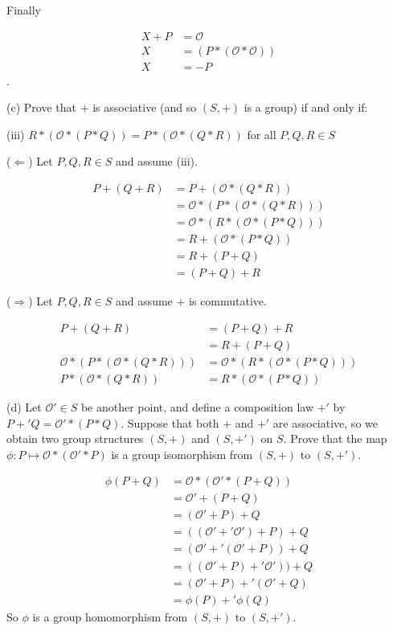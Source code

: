 \documentclass{article}
\begin{document}
Finally

\begin{align*}
X+P &= \mathcal{O}\\
X &= (P * (\mathcal{O} * \mathcal{O}))\\
X &= -P
\end{align*}.

(c) Prove that $+$ is associative (and so $(S,+)$ is a group) if and only if:

(iii) $R*(\mathcal{O}*(P*Q)) = P*(\mathcal{O}*(Q*R))$ for all $P,Q,R \in S$

($\Leftarrow$) Let $P,Q,R \in S$ and assume (iii).

\begin{align*}
P + (Q + R) &= P + (\mathcal{O} * (Q * R)) \\
&= \mathcal{O} * (P * (\mathcal{O} * (Q * R))) \\
&= \mathcal{O} * (R * (\mathcal{O} * (P * Q))) \\
&= R + (\mathcal{O} * (P * Q)) \\
&= R + (P + Q) \\
&= (P + Q) + R
\end{align*}

($\Rightarrow$) Let $P,Q,R \in S$ and assume $+$ is commutative.

\begin{align*}
P + (Q + R) &= (P + Q) + R \\
&= R + (P + Q) \\
\mathcal{O} * (P * (\mathcal{O} * (Q * R))) &= \mathcal{O} * ( R * (\mathcal{O} * (P * Q))) \\
P * (\mathcal{O} * (Q * R)) &= R * (\mathcal{O} * (P * Q))
\end{align*}

(d) Let $\mathcal{O}' \in S$ be another point, and define a composition law $+'$ by $P +' Q = \mathcal{O}' * (P*Q)$. Suppose that both $+$ and $+'$ are associative, so we obtain two group structures $(S,+)$ and $(S,+')$ on $S$. Prove that the map $\phi: P \mapsto \mathcal{O}*(\mathcal{O}'*P)$ is a group isomorphism from $(S,+)$ to $(S,+')$.

\begin{align*}
\phi(P+Q) &= \mathcal{O} * (\mathcal{O}' * (P + Q)) \\
&= \mathcal{O}' + (P+Q) \\
&= (\mathcal{O}'+P)+Q \\
&= ((\mathcal{O}' +' \mathcal{O}')+P)+Q \\
&= (\mathcal{O}' +' (\mathcal{O}'+P))+Q \\
&= ((\mathcal{O}'+P) +' \mathcal{O}')) + Q \\
&= (\mathcal{O}'+P) +' (\mathcal{O}' + Q) \\
&= \phi(P) +' \phi(Q)
\end{align*}
So $\phi$ is a group homomorphism from $(S,+)$ to $(S,+')$.
\end{document}
